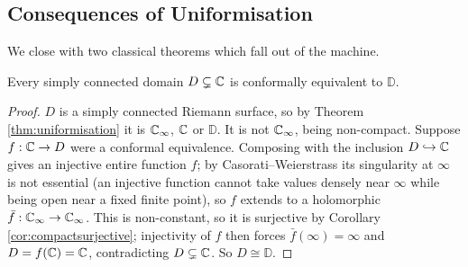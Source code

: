 \documentclass[a4paper]{scrartcl}
\newcommand{\Cinf}{\C_\infty}
\newcommand{\disc}{\mathbb{D}}
\begin{document}
\begin{center}
\end{center}

\subsection{Consequences of Uniformisation}

We close with two classical theorems which fall out of the machine.

\begin{theorem}
	Every simply connected domain $D \subsetneq \mathbb{C}$ is conformally equivalent to $\disc$.
\end{theorem}

\begin{proof}
	$D$ is a simply connected Riemann surface, so by Theorem \ref{thm:uniformisation} it is
	$\Cinf$, $\mathbb{C}$ or $\disc$. It is not $\Cinf$, being non-compact. Suppose
	$f : \mathbb{C} \to D$ were a conformal equivalence. Composing with the inclusion
	$D \hookrightarrow \mathbb{C}$ gives an injective entire function $f$; by
	Casorati--Weierstrass its singularity at $\infty$ is not essential (an injective
	function cannot take values densely near $\infty$ while being open near a fixed finite
	point), so $f$ extends to a holomorphic $\bar f : \Cinf\to\Cinf$. This is non-constant,
	so it is surjective by Corollary \ref{cor:compactsurjective}; injectivity of $f$ then
	forces $\bar f(\infty)=\infty$ and $D = f(\mathbb{C}) = \mathbb{C}$, contradicting $D \subsetneq\mathbb{C}$.
	So $D\cong\disc$.
\end{proof}
\end{document}
